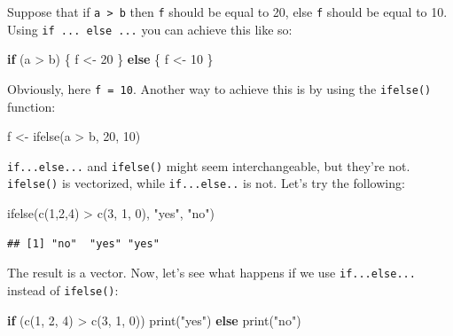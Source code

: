 \documentclass[
]{article}
\newenvironment{Shaded}{\begin{snugshade}}{\end{snugshade}}
\newcommand{\ControlFlowTok}[1]{\textcolor[rgb]{0.13,0.29,0.53}{\textbf{#1}}}
\newcommand{\DecValTok}[1]{\textcolor[rgb]{0.00,0.00,0.81}{#1}}
\newcommand{\FunctionTok}[1]{\textcolor[rgb]{0.00,0.00,0.00}{#1}}
\newcommand{\NormalTok}[1]{#1}
\newcommand{\OtherTok}[1]{\textcolor[rgb]{0.56,0.35,0.01}{#1}}
\newcommand{\SpecialCharTok}[1]{\textcolor[rgb]{0.00,0.00,0.00}{#1}}
\newcommand{\StringTok}[1]{\textcolor[rgb]{0.31,0.60,0.02}{#1}}
\begin{document}
Suppose that if \texttt{a\ \textgreater{}\ b} then \texttt{f} should be equal to 20, else \texttt{f} should be equal to 10. Using \texttt{if\ ...\ else\ ...} you can achieve this like so:

\begin{Shaded}
\begin{Highlighting}[]
\ControlFlowTok{if}\NormalTok{ (a }\SpecialCharTok{\textgreater{}}\NormalTok{ b) \{}
\NormalTok{  f }\OtherTok{\textless{}{-}} \DecValTok{20}
\NormalTok{    \} }\ControlFlowTok{else}\NormalTok{ \{}
\NormalTok{  f }\OtherTok{\textless{}{-}} \DecValTok{10}
\NormalTok{\}}
\end{Highlighting}
\end{Shaded}

Obviously, here \texttt{f\ =\ 10}. Another way to achieve this is by using the \texttt{ifelse()} function:

\begin{Shaded}
\begin{Highlighting}[]
\NormalTok{f }\OtherTok{\textless{}{-}} \FunctionTok{ifelse}\NormalTok{(a }\SpecialCharTok{\textgreater{}}\NormalTok{ b, }\DecValTok{20}\NormalTok{, }\DecValTok{10}\NormalTok{)}
\end{Highlighting}
\end{Shaded}

\texttt{if...else...} and \texttt{ifelse()} might seem interchangeable, but they're not. \texttt{ifelse()} is vectorized, while
\texttt{if...else..} is not. Let's try the following:

\begin{Shaded}
\begin{Highlighting}[]
\FunctionTok{ifelse}\NormalTok{(}\FunctionTok{c}\NormalTok{(}\DecValTok{1}\NormalTok{,}\DecValTok{2}\NormalTok{,}\DecValTok{4}\NormalTok{) }\SpecialCharTok{\textgreater{}} \FunctionTok{c}\NormalTok{(}\DecValTok{3}\NormalTok{, }\DecValTok{1}\NormalTok{, }\DecValTok{0}\NormalTok{), }\StringTok{"yes"}\NormalTok{, }\StringTok{"no"}\NormalTok{)}
\end{Highlighting}
\end{Shaded}

\begin{verbatim}
## [1] "no"  "yes" "yes"
\end{verbatim}

The result is a vector. Now, let's see what happens if we use \texttt{if...else...} instead of \texttt{ifelse()}:

\begin{Shaded}
\begin{Highlighting}[]
\ControlFlowTok{if}\NormalTok{ (}\FunctionTok{c}\NormalTok{(}\DecValTok{1}\NormalTok{, }\DecValTok{2}\NormalTok{, }\DecValTok{4}\NormalTok{) }\SpecialCharTok{\textgreater{}} \FunctionTok{c}\NormalTok{(}\DecValTok{3}\NormalTok{, }\DecValTok{1}\NormalTok{, }\DecValTok{0}\NormalTok{)) }\FunctionTok{print}\NormalTok{(}\StringTok{"yes"}\NormalTok{) }\ControlFlowTok{else} \FunctionTok{print}\NormalTok{(}\StringTok{"no"}\NormalTok{)}
\end{Highlighting}
\end{Shaded}
\end{document}
